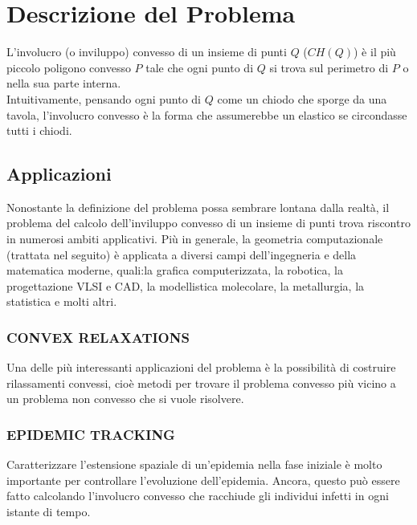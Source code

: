 \documentclass[12pt,a4paper]{report}
\begin{document}
\tableofcontents

\chapter{Descrizione del Problema}\label{ch:problema}
L'involucro (o inviluppo) convesso di un insieme di punti $Q$ ($CH(Q)$) è il più piccolo poligono convesso $P$ tale che ogni punto di $Q$ si trova sul perimetro di $P$ o nella sua parte interna.\\
Intuitivamente, pensando ogni punto di $Q$ come un chiodo che sporge da una tavola, l'involucro convesso è la forma che assumerebbe un elastico se circondasse tutti i chiodi.

\section{Applicazioni}
Nonostante la definizione del problema possa sembrare lontana dalla realtà, il problema del calcolo dell'inviluppo convesso di un insieme di punti trova riscontro in numerosi ambiti applicativi. Più in generale, la geometria computazionale (trattata nel seguito) è applicata a diversi campi dell'ingegneria e della matematica moderne, quali:\hspace{0.1cm}la grafica computerizzata, la robotica, la progettazione VLSI e CAD, la modellistica molecolare, la metallurgia, la statistica e molti altri.

\subsection*{\small{CONVEX RELAXATIONS}}
Una delle più interessanti applicazioni del problema è la possibilità di costruire rilassamenti convessi, cioè metodi per trovare il problema convesso più vicino a un problema non convesso che si vuole risolvere.

\subsection*{\small{EPIDEMIC TRACKING}}
Caratterizzare l'estensione spaziale di un'epidemia nella fase iniziale è molto importante per controllare l'evoluzione dell'epidemia. Ancora, questo può essere fatto calcolando l'involucro convesso che racchiude gli individui infetti in ogni istante di tempo.

\pagebreak
\end{document}
